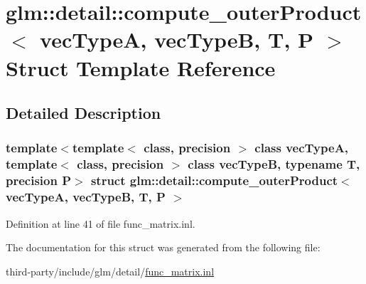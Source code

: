 \hypertarget{structglm_1_1detail_1_1compute__outer_product}{}\section{glm\+:\+:detail\+:\+:compute\+\_\+outer\+Product$<$ vec\+TypeA, vec\+TypeB, T, P $>$ Struct Template Reference}
\label{structglm_1_1detail_1_1compute__outer_product}


\subsection{Detailed Description}
\subsubsection*{template$<$template$<$ class, precision $>$ class vec\+TypeA, template$<$ class, precision $>$ class vec\+TypeB, typename T, precision P$>$\newline
struct glm\+::detail\+::compute\+\_\+outer\+Product$<$ vec\+Type\+A, vec\+Type\+B, T, P $>$}



Definition at line 41 of file func\+\_\+matrix.\+inl.



The documentation for this struct was generated from the following file\+:\begin{DoxyCompactItemize}
\item 
third-\/party/include/glm/detail/\hyperlink{func__matrix_8inl}{func\+\_\+matrix.\+inl}\end{DoxyCompactItemize}
